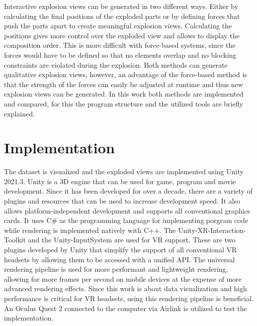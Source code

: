 Interactive explosion views can be generated in two different ways. 
Either by calculating the final positions of the exploded parts or by defining forces that push the parts apart to create meaningful explosion views.
Calculating the positions gives more control over the exploded view and allows to display the composition order. 
This is more difficult with force-based systems, since the forces would have to be defined so that no elements overlap and no blocking constraints are violated during the explosion. 
Both methods can generate qualitative explosion views, however, an advantage of the force-based method is that the strength of the forces can easily be adjusted at runtime and thus new explosion views can be generated. 
In this work both methods are implemented and compared, for this the program structure and the utilized tools are briefly explained. 

\section{Implementation}

The dataset is visualized and the exploded views are implemented using Unity 2021.3. %
Unity is a 3D engine that can be used for game, program and movie development. 
Since it has been developed for over a decade, there are a variety of plugins and resources that can be used to increase development speed. 
It also allows platform-independent development and supports all conventional graphics cards. 
It uses C\# as the programming language for implementing porgram code while rendering is implemented natively with C++.  
The Unity-XR-Interaction-Toolkit and the Unity-InputSystem are used for VR support. %
These are two plugins developed by Unity that simplify the support of all conventional VR headsets by allowing them to be accessed with a unified API.  
The universal rendering pipeline is used for more performant and lightweight rendering, allowing for more frames per second on mobile devices at the expense of more advanced rendering effects. %
Since this work is about data visualization and high performance is critical for VR headsets, using this rendering pipeline is beneficial.
An Oculus Quest 2 connected to the computer via Airlink is utilized to test the implementation. %

